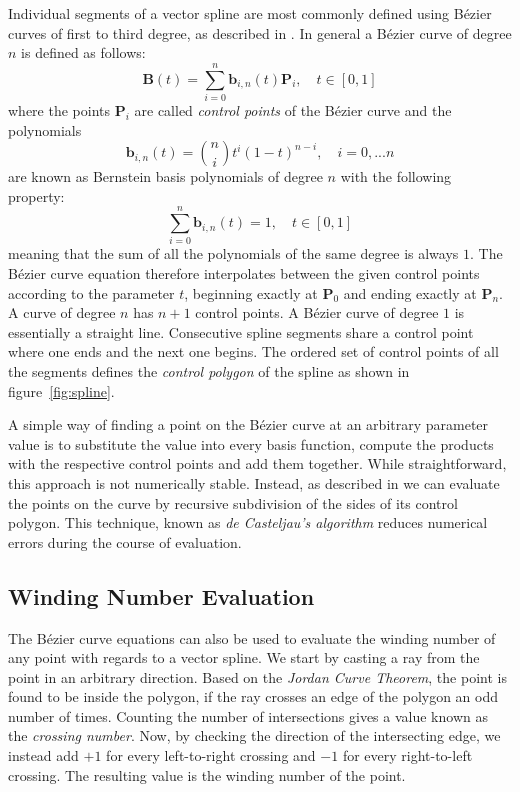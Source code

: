 \documentclass[11pt,a4paper,twoside]{article}
\begin{document}
Individual segments of a vector spline are most commonly defined using B\'{e}zier curves of first to third degree, as described in \cite{Farin02}. In general a B\'{e}zier curve of degree $n$ is defined as follows:
\[ \mathbf{B}(t) = \sum_{i=0}^{n} \mathbf{b}_{i,n}(t)\mathbf{P}_i, \quad t \in [0, 1] \]
where the points $\mathbf{P}_i$ are called \emph{control points} of the B\'{e}zier curve and the polynomials
\[ \mathbf{b}_{i,n}(t) = \binom{n}{i} t^i (1 - t)^{n-i}, \quad i = 0, ... n \]
are known as Bernstein basis polynomials of degree $n$ with the following property:
\[ \sum_{i=0}^{n} \mathbf{b}_{i,n}(t) = 1, \quad t \in [0, 1] \]
meaning that the sum of all the polynomials of the same degree is always $1$. The B\'{e}zier curve equation therefore interpolates between the given control points according to the parameter $t$, beginning exactly at $\mathbf{P}_0$ and ending exactly at $\mathbf{P}_n$. A curve of degree $n$ has $n+1$ control points. A  B\'{e}zier curve of degree $1$ is essentially a straight line. Consecutive spline segments share a control point where one ends and the next one begins. The ordered set of control points of all the segments defines the \emph{control polygon} of the spline as shown in figure~\ref{fig:spline}.

A simple way of finding a point on the  B\'{e}zier curve at an arbitrary parameter value is to substitute the value into every basis function, compute the products with the respective control points and add them together. While straightforward, this approach is not numerically stable. Instead, as described in \cite{Boehm99} we can evaluate the points on the curve by recursive subdivision of the sides of its control polygon. This technique, known as \emph{de Casteljau's algorithm} reduces numerical errors during the course of evaluation.

\subsection{Winding Number Evaluation}
\label{sec:winding}

The B\'{e}zier curve equations can also be used to evaluate the winding number of any point with regards to a vector spline. We start by casting a ray from the point in an arbitrary direction. Based on the \emph{Jordan Curve Theorem}, the point is found to be inside the polygon, if the ray crosses an edge of the polygon an odd number of times. Counting the number of intersections gives a value known as the \emph{crossing number}. Now, by checking the direction of the intersecting edge, we instead add $+1$ for every left-to-right crossing and $-1$ for every right-to-left crossing. The resulting value is the winding number of the point.
\end{document}
